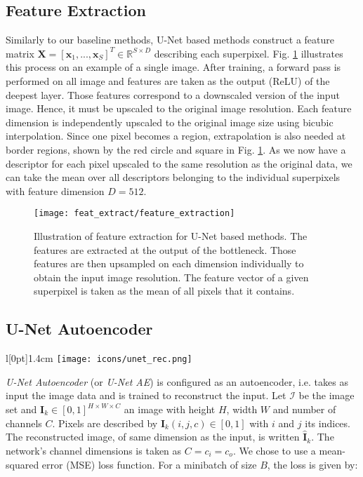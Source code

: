 \clearpage
\subsection{Feature Extraction} \label{feat_extract}
Similarly to our baseline methods, U-Net based methods construct a feature matrix $\boldsymbol{X} = [\boldsymbol{x}_1,...,\boldsymbol{x}_S]^T \in \mathbb{R}^{S \times D}$ describing each superpixel.
Fig. \ref{fig:feat_extract} illustrates this process on an example of a single image.
After training, a forward pass is performed on all image and features are taken as the output (ReLU) of the deepest layer.
Those features correspond to a downscaled version of the input image.
Hence, it must be upscaled to the original image resolution.
Each feature dimension is independently upscaled to the original image size using bicubic interpolation.
Since one pixel becomes a region, extrapolation is also needed at border regions, shown by the red circle and square in Fig. \ref{fig:feat_extract}.
As we now have a descriptor for each pixel upscaled to the same resolution as the original data, we can take the mean over all descriptors belonging to the individual superpixels with feature dimension $D=512$.
\vspace{10pt}

\begin{figure}[htbp]
  \centering
  \texttt{[image: feat\_extract/feature\_extraction]}
  \caption[Feature extraction model]{Illustration of feature extraction for U-Net based methods.
    The features are extracted at the output of the bottleneck.
    Those features are then upsampled on each dimension individually to obtain the input image resolution.
    The feature vector of a given superpixel is taken as the mean of all pixels that it contains.}
  \label{fig:feat_extract}
\end{figure}

\subsection{U-Net Autoencoder}
\begingroup
\setlength\intextsep{0pt}
\begin{wrapfigure}[4]{l}[0pt]{1.4cm}
\texttt{[image: icons/unet\_rec.png]}
\end{wrapfigure}

\textit{U-Net Autoencoder} (or \textit{U-Net AE}) is configured as an autoencoder, i.e.
takes as input the image data and is trained to reconstruct the input.
Let $\mathcal{I}$ be the image set and $\boldsymbol{I}_k \in [0,1]^{H \times W \times C}$ an image with height $H$, width $W$ and number of channels $C$.
Pixels are described by $\boldsymbol{I}_k(i,j,c) \in [0,1]$ with $i$ and $j$ its indices.
The reconstructed image, of same dimension as the input, is written $\boldsymbol{\hat{I}}_k$.
The network's channel dimensions is taken as $C = c_i = c_o$.
We chose to use a mean-squared error (MSE) loss function.
For a minibatch of size $B$, the loss is given by:

